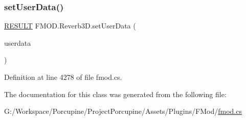 \subsubsection{\texorpdfstring{set\+User\+Data()}{setUserData()}}
{\footnotesize\ttfamily \hyperlink{namespace_f_m_o_d_a305d1176ef3f8c8815861a60407ac33d}{R\+E\+S\+U\+LT} F\+M\+O\+D.\+Reverb3\+D.\+set\+User\+Data (\begin{DoxyParamCaption}\item[{Int\+Ptr}]{userdata }\end{DoxyParamCaption})}



Definition at line 4278 of file fmod.\+cs.



The documentation for this class was generated from the following file\+:\begin{DoxyCompactItemize}
\item 
G\+:/\+Workspace/\+Porcupine/\+Project\+Porcupine/\+Assets/\+Plugins/\+F\+Mod/\hyperlink{fmod_8cs}{fmod.\+cs}\end{DoxyCompactItemize}
